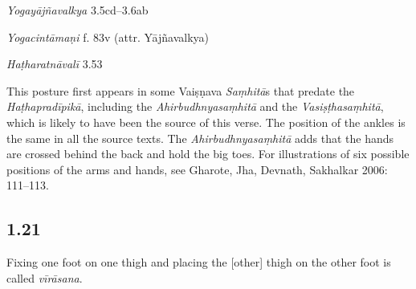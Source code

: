 \begin{ekdosis}
\begin{sources}[hp01_020]
\emph{Yogayājñavalkya} 3.5cd–3.6ab

\begin{versinnote}
\end{versinnote}

\end{sources}

\begin{testimonia}[hp01_020]
\emph{Yogacintāmaṇi} f. 83v (attr. Yājñavalkya)

\begin{versinnote}
\end{versinnote}

\emph{Haṭharatnāvalī} 3.53

\begin{versinnote}
\end{versinnote}

\end{testimonia}

\begin{philcomm}[hp01_020]        
This posture first appears in some Vaiṣṇava \emph{Saṃhitā}s that predate the \emph{Haṭhapradīpikā}, including the \emph{Ahirbudhnyasaṃhitā} and the \emph{Vasiṣṭhasaṃhitā}, which is likely to have been the source of this verse. The position of the ankles is the same in all the source texts. The \emph{Ahirbudhnyasaṃhitā} adds that the hands are crossed behind the back and hold the big toes. For illustrations of six possible positions of the arms and hands, see Gharote, Jha, Devnath, Sakhalkar 2006: 111–113.
\end{philcomm}

\subsection*{1.21}
\begin{translation}[hp01_021]
 Fixing one foot on one thigh and placing the [other] thigh on the other foot is called \emph{vīrāsana}.
\end{translation}


\end{ekdosis}
